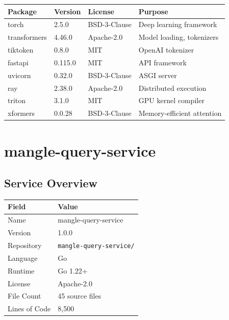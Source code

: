 \documentclass[11pt,a4paper]{article}
\begin{document}
\begin{longtable}{@{}L{3.5cm}L{2cm}L{2.5cm}L{5cm}@{}}
\toprule
\textbf{Package} & \textbf{Version} & \textbf{License} & \textbf{Purpose} \\
\midrule
\endhead
torch & 2.5.0 & BSD-3-Clause & Deep learning framework \\
transformers & 4.46.0 & Apache-2.0 & Model loading, tokenizers \\
tiktoken & 0.8.0 & MIT & OpenAI tokenizer \\
fastapi & 0.115.0 & MIT & API framework \\
uvicorn & 0.32.0 & BSD-3-Clause & ASGI server \\
ray & 2.38.0 & Apache-2.0 & Distributed execution \\
triton & 3.1.0 & MIT & GPU kernel compiler \\
xformers & 0.0.28 & BSD-3-Clause & Memory-efficient attention \\
\bottomrule
\end{longtable}

\newpage

\section{mangle-query-service}

\subsection{Service Overview}

\begin{tabular}{@{}L{4cm}L{10cm}@{}}
\toprule
\textbf{Field} & \textbf{Value} \\
\midrule
Name & mangle-query-service \\
Version & 1.0.0 \\
Repository & \texttt{mangle-query-service/} \\
Language & Go \\
Runtime & Go 1.22+ \\
License & Apache-2.0 \\
File Count & 45 source files \\
Lines of Code & 8,500 \\
\bottomrule
\end{tabular}
\end{document}

